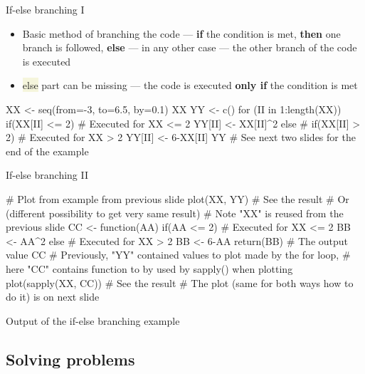 \documentclass[compress, xelatex, 11pt, xcolor=svgnames, aspectratio=169,
	hyperref={
		bookmarks=true,
		unicode=true,
		colorlinks=true,
		pdftitle={Molecular data in R},
		plainpages=false,
		pdfauthor={Vojtech Zeisek},
		pdfsubject={Course about phylogeny and evolution in R},
		pdfcreator={XeLaTeX},
		pdfkeywords={R, evolution, phylogeny, molecular data},
		linkcolor=Crimson, %
		anchorcolor=Magenta, %
		citecolor=Magenta, %
		filecolor=Magenta, %
		menucolor=Magenta, %
		urlcolor=DodgerBlue, %
		},
	url={hyphens, lowtilde} %
	]{beamer}
\renewcommand{\texttt}[1]{\colorbox{Beige}{{\ttfamily #1}}}
\begin{document}
\begin{frame}[fragile]{If-else branching I}
	\begin{itemize}
		\item Basic method of branching the code --- \textbf{if} the condition is met, \textbf{then} one branch is followed, \textbf{else} --- in any other case --- the other branch of the code is executed
		\item \texttt{else} part can be missing --- the code is executed \textbf{only if} the condition is met
	\end{itemize}
	\begin{spluscode}
    XX <- seq(from=-3, to=6.5, by=0.1)
    XX
    YY <- c()
    for (II in 1:length(XX)) {
      if(XX[II] <= 2) { # Executed for XX <= 2
        YY[II] <- XX[II]^2
        } else { # if(XX[II] > 2) # Executed for XX > 2
          YY[II] <- 6-XX[II]
          }
      }
    YY # See next two slides for the end of the example
	\end{spluscode}
\end{frame}

\begin{frame}[fragile]{If-else branching II}
	\begin{spluscode}
    # Plot from example from previous slide
    plot(XX, YY) # See the result
    # Or (different possibility to get very same result)
    # Note "XX" is reused from the previous slide
    CC <- function(AA) {
      if(AA <= 2) { # Executed for XX <= 2
      BB <- AA^2
      } else { # Executed for XX > 2
        BB <- 6-AA
        }
      return(BB) # The output value
      }
     CC # Previously, "YY" contained values to plot made by the for loop,
        # here "CC" contains function to by used by sapply() when plotting
     plot(sapply(XX, CC)) # See the result
    # The plot (same for both ways how to do it) is on next slide
	\end{spluscode}
\end{frame}

\begin{frame}{Output of the if-else branching example}
	\begin{center}
		\texttt{[image: if-else.png]}
	\end{center}
\end{frame}

\subsection{Solving problems}
\end{document}
